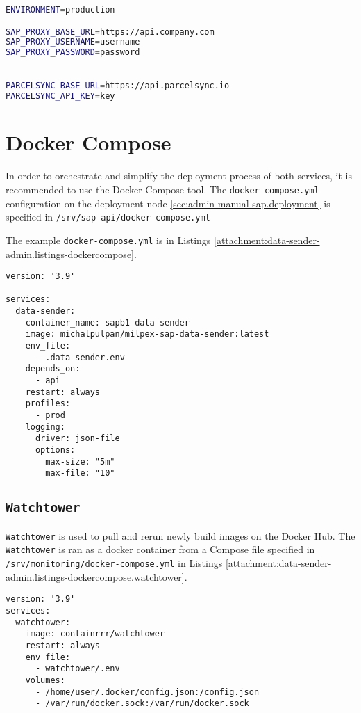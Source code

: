 \begin{lstlisting}[language=bash,caption={Data sender environment configuration}]
ENVIRONMENT=production

SAP_PROXY_BASE_URL=https://api.company.com
SAP_PROXY_USERNAME=username
SAP_PROXY_PASSWORD=password


PARCELSYNC_BASE_URL=https://api.parcelsync.io
PARCELSYNC_API_KEY=key
\end{lstlisting}
\label{attachment:data-sender-admin.listings-evn}


\section{Docker Compose}
In order to orchestrate and simplify the deployment process of both services, it is recommended to use the Docker Compose tool.
The \texttt{docker-compose.yml} configuration on the deployment node \ref{sec:admin-manual-sap.deployment} is specified in \texttt{/srv/sap-api/docker-compose.yml}

The example \texttt{docker-compose.yml} is in Listings \ref{attachment:data-sender-admin.listings-dockercompose}.
\begin{lstlisting}[caption={Data-sender \texttt{docker-compose.yml}}]
version: '3.9'

services:
  data-sender:
    container_name: sapb1-data-sender
    image: michalpulpan/milpex-sap-data-sender:latest
    env_file:
      - .data_sender.env
    depends_on:
      - api
    restart: always
    profiles:
      - prod
    logging:
      driver: json-file
      options:
        max-size: "5m"
        max-file: "10"

\end{lstlisting}
\label{attachment:data-sender-admin.listings-dockercompose}
\subsection{\texttt{Watchtower}}
\texttt{Watchtower} is used to pull and rerun newly build images on the Docker Hub.
The \texttt{Watchtower} is ran as a docker container from a Compose file specified in \texttt{/srv/monitoring/docker-compose.yml} in Listings \ref{attachment:data-sender-admin.listings-dockercompose.watchtower}.

\begin{lstlisting}[caption={Watchtower \texttt{docker-compose.yml}}]
version: '3.9'
services:
  watchtower:
    image: containrrr/watchtower
    restart: always
    env_file:
      - watchtower/.env
    volumes:
      - /home/user/.docker/config.json:/config.json
      - /var/run/docker.sock:/var/run/docker.sock
\end{lstlisting}
\label{attachment:data-sender-admin.listings-dockercompose.watchtower}

